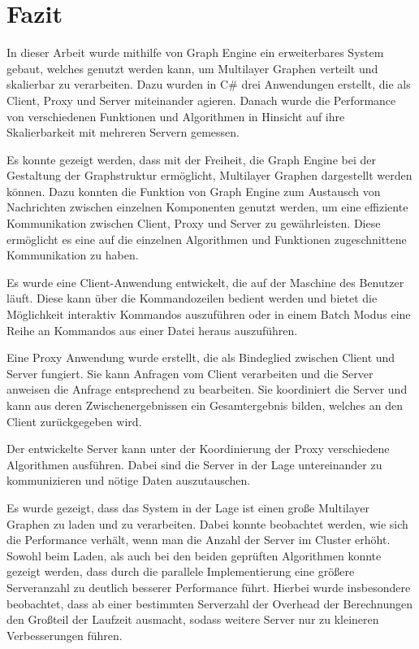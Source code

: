 \chapter{Fazit}

In dieser Arbeit wurde mithilfe von Graph Engine ein erweiterbares System gebaut, welches genutzt werden kann, um Multilayer Graphen verteilt und skalierbar zu verarbeiten.
Dazu wurden in C\# drei Anwendungen erstellt, die als Client, Proxy und Server miteinander agieren.
Danach wurde die Performance von verschiedenen Funktionen und Algorithmen in Hinsicht auf ihre Skalierbarkeit mit mehreren Servern gemessen.


Es konnte gezeigt werden, dass mit der Freiheit, die Graph Engine bei der Gestaltung der Graphstruktur ermöglicht, Multilayer Graphen dargestellt werden können.
Dazu konnten die Funktion von Graph Engine zum Austausch von Nachrichten zwischen einzelnen Komponenten genutzt werden, um eine effiziente Kommunikation zwischen Client, Proxy und Server zu gewährleisten. 
Diese ermöglicht es eine auf die einzelnen Algorithmen und Funktionen zugeschnittene Kommunikation zu haben.


Es wurde eine Client-Anwendung entwickelt, die auf der Maschine des Benutzer läuft. Diese kann über die Kommandozeilen bedient werden und bietet die Möglichkeit interaktiv Kommandos auszuführen oder in einem Batch Modus eine Reihe an Kommandos aus einer Datei heraus auszuführen.

Eine Proxy Anwendung wurde erstellt, die als Bindeglied zwischen Client und Server fungiert. Sie kann Anfragen vom Client verarbeiten und die Server anweisen die Anfrage entsprechend zu bearbeiten. Sie koordiniert die Server und kann aus deren Zwischenergebnissen ein Gesamtergebnis bilden, welches an den Client zurückgegeben wird.

Der entwickelte Server kann unter der Koordinierung der Proxy verschiedene Algorithmen ausführen. Dabei sind die Server in der Lage untereinander zu kommunizieren und nötige Daten auszutauschen.


Es wurde gezeigt, dass das System in der Lage ist einen große Multilayer Graphen zu laden und zu verarbeiten. Dabei konnte beobachtet werden, wie sich die Performance verhält, wenn man die Anzahl der Server im Cluster erhöht.
Sowohl beim Laden, als auch bei den beiden geprüften Algorithmen konnte gezeigt werden, dass durch die parallele Implementierung eine größere Serveranzahl zu deutlich besserer Performance führt.
Hierbei wurde insbesondere beobachtet, dass ab einer bestimmten Serverzahl der Overhead der Berechnungen den Großteil der Laufzeit ausmacht, sodass weitere Server nur zu kleineren Verbesserungen führen.


